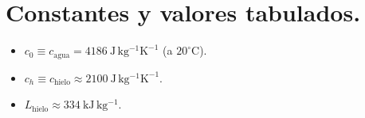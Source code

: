 \documentclass[11pt,twocolumn]{article}
\begin{document}
\section*{Constantes y valores tabulados.}
\begin{itemize}
    \item $c_0 \equiv c_{\text{agua}} = 4186\ \mathrm{J\,kg^{-1}K^{-1}}$ (a $20^\circ$C).
    \item $c_h \equiv c_{\text{hielo}} \approx 2100\ \mathrm{J\,kg^{-1}K^{-1}}$.
    \item $L_{\text{hielo}} \approx 334\ \mathrm{kJ\,kg^{-1}}$.
\end{itemize}

\newpage{}
\onecolumn{}
\printbibliography[title={Referencias}]
\end{document}
